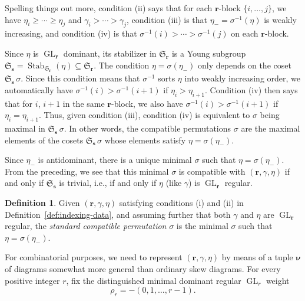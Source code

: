 \documentclass[12pt]{amsart}
\theoremstyle{definition}
\newtheorem{defn}[thm]{Definition}
\theoremstyle{remark}
\newcommand{\rr}{{\mathbf r}}
\newcommand{\sS}{{\mathbf s}}
\newcommand{\nubold}{{\boldsymbol \nu }}
\newcommand{\Sfrak}{{\mathfrak S}}
\DeclareMathOperator{\GL}{GL}
\DeclareMathOperator{\Stab}{Stab}
\begin{document}
Spelling things out more, condition (ii) says that for each $\rr
$-block $\{i,\ldots,j \}$, we have $\eta _{i}\geq \cdots \geq \eta
_{j}$ and $\gamma _{i} >\cdots > \gamma _{j}$, condition (iii) is that
$\eta _{-} = \sigma ^{-1}(\eta )$ is weakly increasing, and condition
(iv) is that $\sigma ^{-1}(i) >\cdots > \sigma ^{-1}(j)$ on each $\rr
$-block.

Since $\eta $ is $\GL _{\rr }$ dominant, its stabilizer in $\Sfrak
_{\rr }$ is a Young subgroup $\Sfrak _{\sS } = \Stab _{\Sfrak _{\rr
}}(\eta )\subseteq \Sfrak _{\rr }$.  The condition $\eta = \sigma
(\eta _{-})$ only depends on the coset $\Sfrak _{\sS }\, \sigma $.
Since this condition means that $\sigma ^{-1}$ sorts $\eta $ into
weakly increasing order, we automatically have $\sigma ^{-1}(i)>\sigma
^{-1}(i+1)$ if $\eta _{i}>\eta _{i+1}$.  Condition (iv) then says that
for $i$, $i+1$ in the same $\rr $-block, we also have $\sigma
^{-1}(i)>\sigma ^{-1}(i+1)$ if $\eta _{i} = \eta _{i+1}$.  Thus, given
condition (iii), condition (iv) is equivalent to $\sigma $ being
maximal in $\Sfrak _{\sS }\, \sigma $.  In other words, the compatible
permutations $\sigma $ are the maximal elements of the cosets $\Sfrak
_{\sS }\, \sigma $ whose elements satisfy $\eta =\sigma (\eta _{-})$.

Since $\eta _{-}$ is antidominant, there is a unique minimal $\sigma
$ such that $\eta =\sigma (\eta _{-})$.  From the preceding, we see
that this minimal $\sigma $ is compatible with $(\rr ,\gamma ,\eta )$
if and only if $\Sfrak _{\sS}$ is trivial, i.e., if and only if $\eta
$ (like $\gamma $) is $\GL _{\rr }$ regular.

\begin{defn}\label{def:standard-compat}
Given $(\rr , \gamma , \eta )$ satisfying conditions (i) and (ii) in
Definition~\ref{def:indexing-data}, and assuming further that both
$\gamma $ and $\eta $ are $\GL _{\rr }$ regular, the {\em standard
compatible permutation} $\sigma $ is the minimal $\sigma $ such that
$\eta =\sigma (\eta _{-})$.
\end{defn}

For combinatorial purposes, we need to represent $(\rr ,\gamma ,\eta
)$ by means of a tuple $\nubold $ of diagrams somewhat more general
than ordinary skew diagrams.  For every positive integer $r$, fix the
distinguished minimal dominant regular $\GL _{r}$ weight
\begin{equation}\label{e:rho-r}
\rho _{r} = -(0,1,\ldots,r-1).
\end{equation}
\end{document}
